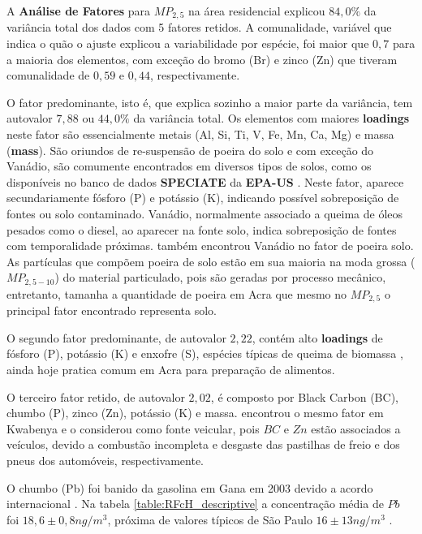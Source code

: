 A \textbf{Análise de Fatores} para $MP_{2,5}$ na área residencial explicou 
$84,0\%$ da variância total dos dados com 5 fatores retidos.
A comunalidade, variável que indica o quão o ajuste explicou a variabilidade por 
espécie, foi maior que $0,7$ para a maioria dos elementos,
com exceção do bromo (Br) e zinco (Zn) que tiveram comunalidade de $0,59$ e 
$0,44$, respectivamente.

O fator predominante, isto é, que explica sozinho a maior parte da variância, 
tem autovalor $7,88$ ou $44,0\%$ da variância total.
Os elementos com maiores \textbf{loadings} neste fator são essencialmente 
metais (Al, Si, Ti, V, Fe, Mn, Ca, Mg) e massa (\textbf{mass}).
São oriundos de re-suspensão de poeira do solo e com exceção do Vanádio,
são comumente encontrados em diversos tipos de solos, como os disponíveis no 
banco de dados \textbf{SPECIATE} da \textbf{EPA-US} \citep{simon2010}.
Neste fator, aparece secundariamente fósforo (P) e potássio (K), indicando 
possível sobreposição de fontes ou solo contaminado. 
Vanádio, normalmente associado a queima de óleos pesados como o diesel, ao 
aparecer na fonte solo, indica sobreposição de fontes com temporalidade próximas.
\cite{aboh2009} também encontrou Vanádio no fator de poeira solo.
As partículas que compõem poeira de solo estão em sua maioria na moda grossa 
($MP_{2,5-10}$) do material particulado, pois são geradas por processo mecânico,
entretanto, tamanha a quantidade de poeira em Acra que mesmo no $MP_{2,5}$ o 
principal fator encontrado representa solo.  

O segundo fator predominante, de autovalor $2,22$, contém alto \textbf{loadings}
de fósforo (P), potássio (K) e enxofre (S), espécies típicas de queima de 
biomassa \citep{reid2005}, ainda hoje pratica comum em Acra para preparação 
de alimentos. 

O terceiro fator retido, de autovalor $2,02$, é composto por Black Carbon (BC), 
chumbo (P), zinco (Zn), potássio (K) e massa.
\cite{aboh2009} encontrou o mesmo fator em Kwabenya e o considerou como fonte
veicular, pois $BC$ e $Zn$ estão associados a veículos, devido a combustão 
incompleta e desgaste das pastilhas de freio e dos pneus dos automóveis, 
respectivamente.

O chumbo (Pb) foi banido da gasolina em Gana em 2003 devido a acordo 
internacional \citep{epa2015}.  
Na tabela \ref{table:RFcH_descriptive} a concentração média de $Pb$ 
foi $18,6 \pm 0,8 n g /m^3$, próxima de valores típicos de São Paulo 
$16 \pm 13 n g /m^3$ \citep{andrade2012}.

